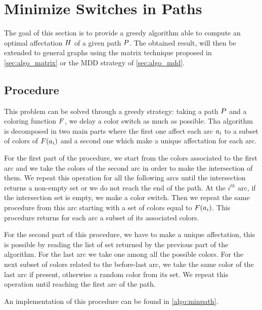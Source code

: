 \section{Minimize Switches in Paths}

The goal of this section is to provide a greedy algorithm able to compute an optimal affectation $H$ of a given path $P$. The obtained result, will then be extended to general graphs using the matrix technique proposed in \cref{sec:algo_matrix} or the MDD strategy of \cref{sec:algo_mdd}.

\subsection{Procedure}
\label{sec:path_proc}
This problem can be solved through a greedy strategy: taking a path $P$ and a coloring function $F$, we delay a color switch as much as possible. Tha algorithm is decomposed in two main parts where the first one affect each arc $a_i$ to a subset of colors of $F(a_i)$ and a second one which make a unique affectation for each arc.

For the first part of the procedure, we start from the colors associated to the first arc and we take the colors of the second arc in order to make the intersection of them. We repeat this operation for all the following arcs until the intersection returns a non-empty set or we do not reach the end of the path. At the $i^{th}$ arc, if the intersection set is empty, we make a color switch. Then we repeat the same procedure from this arc starting with a set of colors equal to $F(a_i)$. This procedure returns for each arc a subset of its associated colors.

For the second part of this procedure, we have to make a unique affectation, this is possible by reading the list of set returned by the previous part of the algorithm. For the last arc we take one among all the possible colors. For the next subset of colors related to the before-last arc, we take the same color of the last arc if present, otherwise a random color from its set. We repeat this operation until reaching the first arc of the path.

An implementation of this procedure can be found in \cref{algo:minpath}.


